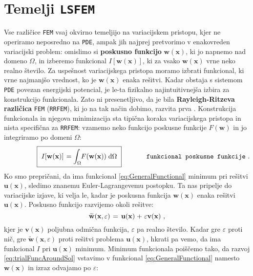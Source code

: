 \section{Temelji \texttt{LSFEM}}

Vse različice \texttt{FEM} vsaj okvirno temeljijo na variacijskem pristopu, kjer ne operiramo neposredno na \texttt{PDE}, ampak jih najprej pretvorimo v enakovreden variacijski problem: omislimo si \textbf{poskusno funkcijo} $\mathbf{w}(\mathbf{x})$, ki jo napnemo nad domeno $\Omega$, in izberemo funkcional $I[\mathbf{w}(\mathbf{x})]$, ki za vsako $\mathbf{w}(\mathbf{x})$ vrne neko realno število. Za uspešnost variacijskega pristopa moramo izbrati funkcional, ki vrne najmanjšo vrednost, ko je $\mathbf{w}(\mathbf{x})$ enaka rešitvi. Kadar obstaja s sistemom \texttt{PDE} povezan energijski potencial, je le-ta fizikalno najintuitivnejša izbira za konstrukcijo funkcionala. Zato ni presenetljivo, da je bila \textbf{Rayleigh-Ritzeva različica} \texttt{FEM} (\texttt{RRFEM}), ki jo na tak način dobimo, razvita prva \cite{RitzW-Variationsprobleme}. Konstrukcija funkcionala in njegova minimizacija sta tipična koraka variacijskega pristopa in nista specifična za \texttt{RRFEM}: vzamemo neko funkcijo poskusne funkcije $F\left(\mathbf{w}\right)$ in jo integriramo po domeni $\Omega$:
\vspace{-1mm}
\begin{equation}
	\hspace{17mm}
	\boxed{
		\vphantom{\bigg(} \ I\qty[\mathbf{w(x)}]\mkern2mu
		=
		\int_{\Omega} \mkern-4mu F\qty(\mathbf{w(x)}) \mkern5mu \ud \Omega \ 
	}
	\hspace{13mm} \texttt{funkcional poskusne funkcije} \ .
	\label{eq:GeneralFunctional}
\end{equation}
Ko smo prepričani, da ima funkcional \eqref{eq:GeneralFunctional} minimum pri rešitvi $\mathbf{u}(\mathbf{x})$, sledimo znanemu Euler-Lagrange\-ve\-mu postopku. Ta nas pripelje do variacijske izjave, ki velja le, kadar je poskusna funkcija $\mathbf{w}(\mathbf{x})$ enaka rešitvi $\mathbf{u}(\mathbf{x})$. Poskusno funkcijo razvijemo okoli rešitve:
\begin{equation}
	\widetilde{\mathbf{w}}(\mathbf{x}, \varepsilon) \mkern2mu
	=
	\, \mathbf{u}(\mathbf{x}) \mkern1mu + \mkern1.5mu \varepsilon \mathbf{v}(\mathbf{x}) \ ,
	\label{eq:trialFuncAroundSol}
\end{equation}
kjer je $\mathbf{v}(\mathbf{x})$ poljubna odmična funkcija, $\varepsilon$ pa realno število. Kadar gre $\varepsilon$ proti nič, gre $\widetilde{\mathbf{w}}(\mathbf{x}, \varepsilon)$ proti rešitvi problema $\mathbf{u}(\mathbf{x})$, hkrati pa vemo, da ima funkcional $I$ pri $\mathbf{u}(\mathbf{x})$ minimum. Minimum funkcionala poiščemo tako, da razvoj \eqref{eq:trialFuncAroundSol} vstavimo v funkcional \eqref{eq:GeneralFunctional} namesto $\mathbf{w}(\mathbf{x})$ in izraz odvajamo po $\varepsilon$:
